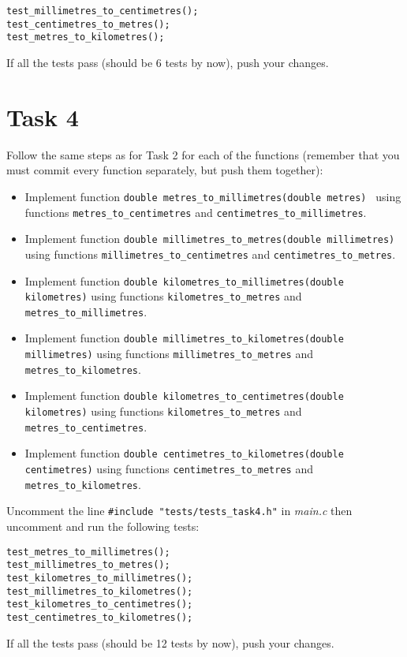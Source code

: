 \documentclass[a4paper,11pt]{article}
\begin{document}
\begin{lstlisting}
test_millimetres_to_centimetres();
test_centimetres_to_metres();
test_metres_to_kilometres();
\end{lstlisting}

If all the tests pass (should be 6 tests by now), push your changes.

\section*{Task 4}

Follow the same steps as for Task 2 for each of the functions (remember that you must commit every function separately, but push them together):

\begin{itemize}
\item Implement function \lstinline{double metres_to_millimetres(double metres) } using functions \lstinline{metres_to_centimetres} and \lstinline{centimetres_to_millimetres}.
\item Implement function \lstinline{double millimetres_to_metres(double millimetres)} using functions \lstinline{millimetres_to_centimetres} and \lstinline{centimetres_to_metres}.
\item Implement function \lstinline{double kilometres_to_millimetres(double kilometres)} using functions \lstinline{kilometres_to_metres} and \lstinline{metres_to_millimetres}.
\item Implement function \lstinline{double millimetres_to_kilometres(double millimetres)} using functions \lstinline{millimetres_to_metres} and \lstinline{metres_to_kilometres}.
\item Implement function \lstinline{double kilometres_to_centimetres(double kilometres)} using functions \lstinline{kilometres_to_metres} and \lstinline{metres_to_centimetres}.
\item Implement function \lstinline{double centimetres_to_kilometres(double centimetres)} using functions \lstinline{centimetres_to_metres} and \lstinline{metres_to_kilometres}.
\end{itemize}

Uncomment the line \lstinline{#include "tests/tests_task4.h"} in \emph{main.c} then uncomment and run the following tests:

\begin{lstlisting}
test_metres_to_millimetres();
test_millimetres_to_metres();
test_kilometres_to_millimetres();
test_millimetres_to_kilometres();
test_kilometres_to_centimetres();
test_centimetres_to_kilometres();
\end{lstlisting}

If all the tests pass (should be 12 tests by now), push your changes.
\end{document}

